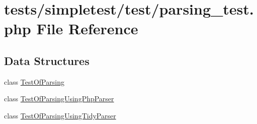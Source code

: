 \hypertarget{parsing__test_8php}{\section{tests/simpletest/test/parsing\-\_\-test.php File Reference}
\label{parsing__test_8php}
}
\subsection*{Data Structures}
\begin{DoxyCompactItemize}
\item 
class \hyperlink{class_test_of_parsing}{Test\-Of\-Parsing}
\item 
class \hyperlink{class_test_of_parsing_using_php_parser}{Test\-Of\-Parsing\-Using\-Php\-Parser}
\item 
class \hyperlink{class_test_of_parsing_using_tidy_parser}{Test\-Of\-Parsing\-Using\-Tidy\-Parser}
\end{DoxyCompactItemize}
